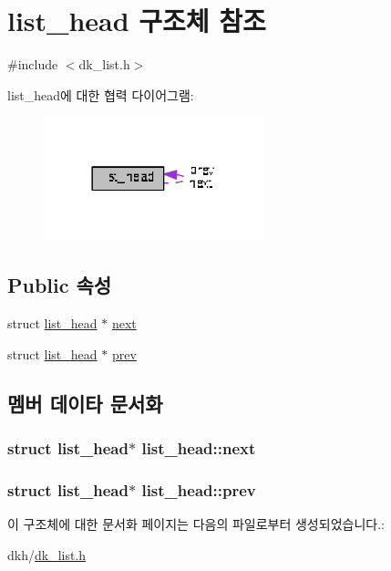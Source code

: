 \hypertarget{structlist__head}{\section{list\+\_\+head 구조체 참조}
\label{structlist__head}
}


{\ttfamily \#include $<$dk\+\_\+list.\+h$>$}



list\+\_\+head에 대한 협력 다이어그램\+:\nopagebreak
\begin{figure}[H]
\begin{center}
\leavevmode
\includegraphics[width=182pt]{structlist__head__coll__graph}
\end{center}
\end{figure}
\subsection*{Public 속성}
\begin{DoxyCompactItemize}
\item 
struct \hyperlink{structlist__head}{list\+\_\+head} $\ast$ \hyperlink{structlist__head_ac3b0ff0dfb978a0cfbdad6b9d19cdcfe}{next}
\item 
struct \hyperlink{structlist__head}{list\+\_\+head} $\ast$ \hyperlink{structlist__head_ae4298f7975979e5f6bb406c40c1fa443}{prev}
\end{DoxyCompactItemize}


\subsection{멤버 데이타 문서화}
\hypertarget{structlist__head_ac3b0ff0dfb978a0cfbdad6b9d19cdcfe}{
\subsubsection[{next}]{\setlength{\rightskip}{0pt plus 5cm}struct {\bf list\+\_\+head}$\ast$ list\+\_\+head\+::next}}\label{structlist__head_ac3b0ff0dfb978a0cfbdad6b9d19cdcfe}
\hypertarget{structlist__head_ae4298f7975979e5f6bb406c40c1fa443}{
\subsubsection[{prev}]{\setlength{\rightskip}{0pt plus 5cm}struct {\bf list\+\_\+head}$\ast$ list\+\_\+head\+::prev}}\label{structlist__head_ae4298f7975979e5f6bb406c40c1fa443}


이 구조체에 대한 문서화 페이지는 다음의 파일로부터 생성되었습니다.\+:\begin{DoxyCompactItemize}
\item 
dkh/\hyperlink{dk__list_8h}{dk\+\_\+list.\+h}\end{DoxyCompactItemize}
